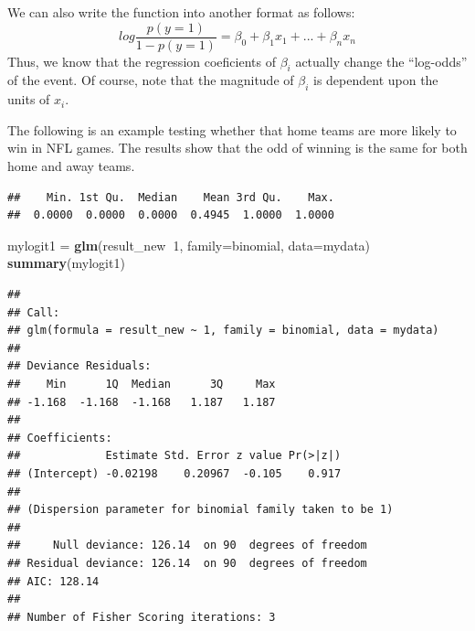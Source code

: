 \documentclass[
]{book}
\newenvironment{Shaded}{\begin{snugshade}}{\end{snugshade}}
\newcommand{\DataTypeTok}[1]{\textcolor[rgb]{0.13,0.29,0.53}{#1}}
\newcommand{\DecValTok}[1]{\textcolor[rgb]{0.00,0.00,0.81}{#1}}
\newcommand{\KeywordTok}[1]{\textcolor[rgb]{0.13,0.29,0.53}{\textbf{#1}}}
\newcommand{\NormalTok}[1]{#1}
\newcommand{\OperatorTok}[1]{\textcolor[rgb]{0.81,0.36,0.00}{\textbf{#1}}}
\newcommand{\StringTok}[1]{\textcolor[rgb]{0.31,0.60,0.02}{#1}}
\begin{document}
We can also write the function into another format as follows:
\[log \frac{p(y=1)}{1-p(y=1)}= \beta_0+\beta_1x_1+...+\beta_nx_n\]
Thus, we know that the regression coeficients of \(\beta_i\) actually change the ``log-odds'' of the event. Of course, note that the magnitude of \(\beta_i\) is dependent upon the units of \(x_i\).

The following is an example testing whether that home teams are more likely to win in NFL games. The results show that the odd of winning is the same for both home and away teams.

\begin{Shaded}
\end{Shaded}

\begin{verbatim}
##    Min. 1st Qu.  Median    Mean 3rd Qu.    Max. 
##  0.0000  0.0000  0.0000  0.4945  1.0000  1.0000
\end{verbatim}

\begin{Shaded}
\begin{Highlighting}[]
\NormalTok{mylogit1 =}\StringTok{ }\KeywordTok{glm}\NormalTok{(result_new}\OperatorTok{~}\DecValTok{1}\NormalTok{, }\DataTypeTok{family=}\NormalTok{binomial, }\DataTypeTok{data=}\NormalTok{mydata)}
\KeywordTok{summary}\NormalTok{(mylogit1)}
\end{Highlighting}
\end{Shaded}

\begin{verbatim}
## 
## Call:
## glm(formula = result_new ~ 1, family = binomial, data = mydata)
## 
## Deviance Residuals: 
##    Min      1Q  Median      3Q     Max  
## -1.168  -1.168  -1.168   1.187   1.187  
## 
## Coefficients:
##             Estimate Std. Error z value Pr(>|z|)
## (Intercept) -0.02198    0.20967  -0.105    0.917
## 
## (Dispersion parameter for binomial family taken to be 1)
## 
##     Null deviance: 126.14  on 90  degrees of freedom
## Residual deviance: 126.14  on 90  degrees of freedom
## AIC: 128.14
## 
## Number of Fisher Scoring iterations: 3
\end{verbatim}
\end{document}
